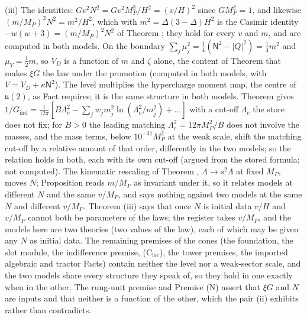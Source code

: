 (iii) The identities: $Gv^{2}N^{2} = Gv^{2}M_{P}^{2}/H^{2} = (v/H)^{2}$ since $GM_{P}^{2} = 1$, and likewise $(m/M_{P})^{2}N^{2} = m^{2}/H^{2}$, which with $m^{2} = \Delta(3 - \Delta)H^{2}$ is the Casimir identity $-w(w + 3) = (m/M_{P})^{2}N^{2}$ of Theorem ; they hold for every $v$ and $m$, and are computed in both models. On the boundary $\sum_{j}\mu_{j}^{2} = \tfrac14(\mathsf{N}^{2} - |Q|^{2}) = \tfrac14 m^{2}$ and $\mu_{Y} = \tfrac12 m$, so $V_{D}$ is a function of $m$ and $\zeta$ alone, the content of Theorem  that makes $\xi G$ the law under the promotion (computed in both models, with $V = V_{D} + \kappa\mathsf{N}^{2}$). The level multiplies the hypercharge moment map, the centre of $\mathfrak{u}(2)$, as Fact  requires; it is the same structure in both models. Theorem  gives $1/G_{\mathrm{ind}} = \tfrac{1}{12\pi}[B\Lambda_{c}^{2} - \sum_{j}w_{j}m_{j}^{2}\ln(\Lambda_{c}^{2}/m_{j}^{2}) + \dots]$ with a cut-off $\Lambda_{c}$ the store does not fix; for $B > 0$ the leading matching $\Lambda_{c}^{2} = 12\pi M_{P}^{2}/B$ does not involve the masses, and the mass terms, below $10^{-31}M_{P}^{2}$ at the weak scale, shift the matching cut-off by a relative amount of that order, differently in the two models; so the relation holds in both, each with its own cut-off (argued from the stored formula; not computed). The kinematic rescaling of Theorem , $\Lambda \to s^{2}\Lambda$ at fixed $M_{P}$, moves $N$; Proposition  reads $m/M_{P}$ as invariant under it, so it relates models at different $N$ and the same $v/M_{P}$, and says nothing against two models at the same $N$ and different $v/M_{P}$. Theorem (iii) says that once $N$ is initial data $v/H$ and $v/M_{P}$ cannot both be parameters of the laws; the register takes $v/M_{P}$, and the models here are two theories (two values of the law), each of which may be given any $N$ as initial data. The remaining premises of the cones (the foundation, the slot module, the indifference premise, (C$_{\mathrm{loc}}$), the tower premises, the imported algebraic and tractor Facts) contain neither the level nor a weak-sector scale, and the two models share every structure they speak of, so they hold in one exactly when in the other. The rung-unit premise and Premise (N) assert that $\xi G$ and $N$ are inputs and that neither is a function of the other, which the pair (ii) exhibits rather than contradicts.

